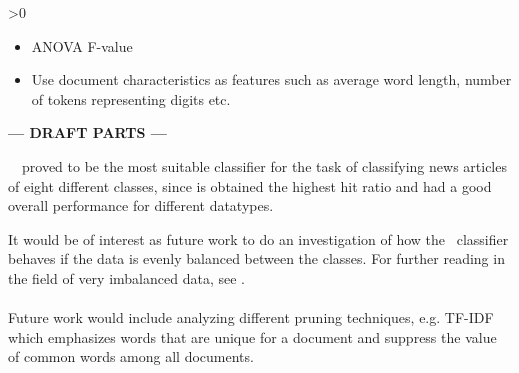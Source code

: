 \ifnum\printdraft>0
	\begin{itemize}
		\item ANOVA F-value
		\item Use document characteristics as features such as average word length, number of tokens representing digits etc.
	\end{itemize}
\else
\begin{center}
	\textbf{--- DRAFT PARTS ---}
\end{center}
\fi
\mn\ \nb\ proved to be the most suitable classifier for the task of classifying news articles of eight different classes, since is obtained the highest hit ratio and had a good overall performance for different datatypes.

It would be of interest as future work to do an investigation of how the \rf\ classifier behaves if the data is evenly balanced between the classes. For further reading in the field of very imbalanced data, see \cite{Chen}.
\\\\
Future work would include analyzing different pruning techniques, e.g. TF-IDF which emphasizes words that are unique for a document and suppress the value of common words among all documents. 

